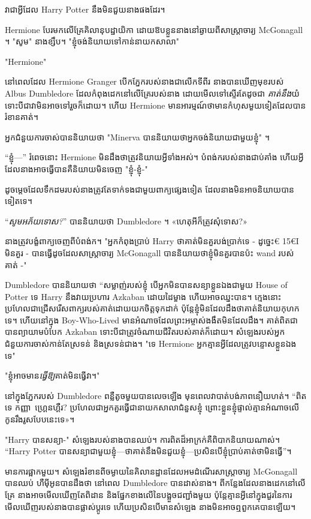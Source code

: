 វាជាអ្វីដែល Harry Potter នឹងមិនជួយនាងផងដែរ។

Hermione បែរមកលើគ្រែគិលានុបដ្ឋាយិកា ដោយឱបខ្លួននាងនៅឆ្ងាយពីសាស្រ្តាចារ្យ McGonagall ។ "សូម" នាងខ្សឹប។ "ខ្ញុំចង់និយាយទៅកាន់នាយកសាលា"

\later

"Hermione"

នៅពេលដែល Hermione Granger បើកភ្នែករបស់នាងជាលើកទីពីរ នាងបានឃើញមុខរបស់ Albus Dumbledore ដែលកំពុងដេកនៅលើគ្រែរបស់នាង ដោយមើលទៅស្ទើរតែដូចជា \emph{គាត់នឹង}យំ ទោះបីជាវាមិនអាចទៅរួចក៏ដោយ។ ហើយ Hermione មាន​អារម្មណ៍​ថា​មាន​កំហុស​មួយ​ទៀត​ដែល​បាន​រំខាន​គាត់។

អ្នកជំនួយការចាស់បាននិយាយថា "Minerva បាននិយាយថាអ្នកចង់និយាយជាមួយខ្ញុំ" ។

“ខ្ញុំ—” រំពេចនោះ Hermione មិនដឹងថាត្រូវនិយាយអ្វីទាំងអស់។ បំពង់ករបស់នាងជាប់គាំង ហើយអ្វីដែលនាងអាចធ្វើបានគឺនិយាយមិនចេញ "ខ្ញុំ-ខ្ញុំ-"

ដូចម្ដេចដែលទឹកដមរបស់នាងត្រូវតែទាក់ទងជាមួយពាក្យផ្សេងទៀត ដែលនាងមិនអាចនិយាយបានទៀតទេ។

“\emph{សូមអភ័យទោស?}” បាននិយាយថា Dumbledore ។ «ហេតុអីក៏ត្រូវសុំទោស?»

នាងត្រូវបង្ខំពាក្យចេញពីបំពង់ក។ "អ្នកកំពុងប្រាប់ Harry ថាគាត់មិនគួរបង់ប្រាក់ទេ - ដូច្នេះ€ 15€{I} មិនគួរ - បានធ្វើដូចដែលសាស្រ្តាចារ្យ McGonagall បាននិយាយថាខ្ញុំមិនគួរបានប៉ះ wand របស់គាត់ -"

Dumbledore បាននិយាយថា “សម្លាញ់របស់ខ្ញុំ បើអ្នកមិនបានសន្យាខ្លួនឯងជាមួយ House of Potter ទេ Harry នឹងវាយប្រហារ Azkaban ដោយដៃម្ខាង ហើយអាចឈ្នះបាន។ ក្មេងនោះប្រហែលជាជ្រើសរើសពាក្យរបស់គាត់ដោយយកចិត្តទុកដាក់ ប៉ុន្តែខ្ញុំមិនដែលដឹងថាគាត់និយាយកុហកទេ។ ហើយនៅក្នុង Boy-Who-Lived មានអំណាចដែលព្រះអម្ចាស់ងងឹតមិនដែលដឹង។ គាត់ពិតជាបានព្យាយាមបំបែក Azkaban ទោះបីជាត្រូវចំណាយជីវិតរបស់គាត់ក៏ដោយ។ សំឡេង​របស់​អ្នក​ជំនួយការ​ចាស់​កាន់​តែ​ស្រទន់ និង​ស្រទន់​ជាង។ "ទេ Hermione អ្នកគ្មានអ្វីដែលត្រូវបន្ទោសខ្លួនឯងទេ"

"ខ្ញុំអាចមាន\emph{ធ្វើឱ្យ}គាត់មិនធ្វើវា។"

នៅក្នុងភ្នែករបស់ Dumbledore ពន្លឺតូចមួយបានលេចឡើង មុនពេលវាបាត់បង់ភាពនឿយហត់។ “ពិតទេ កញ្ញា~ហ្គ្រេនហ្គឺរ? ប្រហែល​ជា​អ្នក​គួរ​ធ្វើ​ជា​នាយក​សាលា​ជំនួស​ខ្ញុំ ព្រោះ​ខ្លួន​ខ្ញុំ​ផ្ទាល់​គ្មាន​អំណាច​លើ​កូន​រឹងរូស​បែប​នេះ​ទេ»។

"Harry បានសន្យា-" សំឡេងរបស់នាងបានឈប់។ ការពិតដ៏អាក្រក់គឺពិបាកនិយាយណាស់។ “Harry Potter បានសន្យាជាមួយខ្ញុំ—ថាគាត់នឹងមិនជួយខ្ញុំ—ប្រសិនបើខ្ញុំប្រាប់គាត់ថាមិនធ្វើ”។

មានការផ្អាកមួយ។ សំឡេងរំខានពីចម្ងាយនៃគិលានដ្ឋានដែលអមដំណើរសាស្ត្រាចារ្យ McGonagall បានឈប់ ហឺម៉ីអូនបានដឹងថា នៅពេល Dumbledore បានដាស់នាង។ ពីកន្លែងដែលនាងដេកនៅលើគ្រែ នាងអាចមើលឃើញតែពិដាន និងផ្នែកខាងលើនៃបង្អួចជញ្ជាំងមួយ ប៉ុន្តែគ្មានអ្វីនៅក្នុងជួរនៃការមើលឃើញរបស់នាងបានផ្លាស់ប្តូរទេ ហើយប្រសិនបើមានសំឡេង នាងមិនអាចឮពួកគេបានឡើយ។

